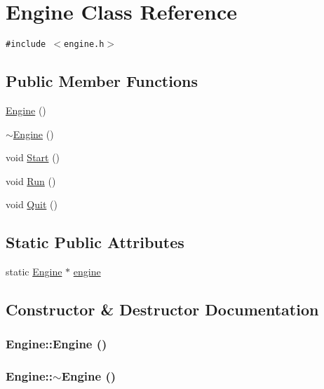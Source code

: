 \hypertarget{class_engine}{
\section{Engine Class Reference}
\label{class_engine}
}
{\tt \#include $<$engine.h$>$}

\subsection*{Public Member Functions}
\begin{CompactItemize}
\item 
\hyperlink{class_engine_8c98683b0a3aa28d8ab72a8bcd0d52f2}{Engine} ()
\item 
\hyperlink{class_engine_8ef7030a089ecb30bbfcb9e43094717a}{$\sim$Engine} ()
\item 
void \hyperlink{class_engine_1fbe9f5cb4abc3572e432cae1f154817}{Start} ()
\item 
void \hyperlink{class_engine_f4c789fb939a0870426c698a5124a0ee}{Run} ()
\item 
void \hyperlink{class_engine_c703279e3531bc1e668115affceb8c37}{Quit} ()
\end{CompactItemize}
\subsection*{Static Public Attributes}
\begin{CompactItemize}
\item 
static \hyperlink{class_engine}{Engine} $\ast$ \hyperlink{class_engine_84995269a911eabc5abd9dfa682fd05d}{engine}
\end{CompactItemize}


\subsection{Constructor \& Destructor Documentation}
\hypertarget{class_engine_8c98683b0a3aa28d8ab72a8bcd0d52f2}{
\subsubsection[{Engine}]{\setlength{\rightskip}{0pt plus 5cm}Engine::Engine ()}}
\label{class_engine_8c98683b0a3aa28d8ab72a8bcd0d52f2}


\hypertarget{class_engine_8ef7030a089ecb30bbfcb9e43094717a}{
\subsubsection[{$\sim$Engine}]{\setlength{\rightskip}{0pt plus 5cm}Engine::$\sim$Engine ()}}
\label{class_engine_8ef7030a089ecb30bbfcb9e43094717a}




